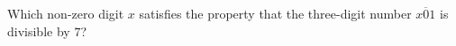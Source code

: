 Which non-zero digit $x$ satisfies the property that the three-digit number $\overline{x01}$ is divisible by $7$?

